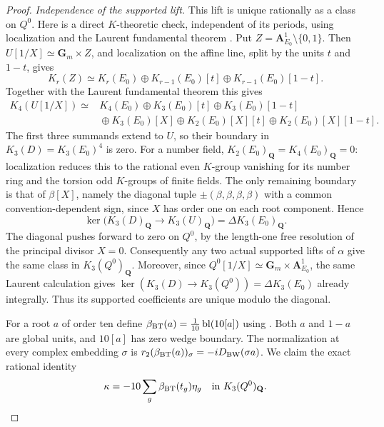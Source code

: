\documentclass[11pt,a4paper]{article}
\theoremstyle{remark}
\begin{document}
\begin{proof}
\emph{Independence of the supported lift.}
This lift is unique rationally as a class on $Q^0$.
Here is a direct $K$-theoretic check, independent of its periods,
using localization and the Laurent fundamental theorem \cite{Weibel}.
Put $Z=\mathbf A^1_{E_0}\setminus\{0,1\}$.  Then
$U[1/X]\simeq\mathbf G_m\times Z$, and localization on the
affine line, split by the units $t$ and $1-t$, gives
\[
 K_r(Z)\simeq K_r(E_0)\oplus
       K_{r-1}(E_0)[t]\oplus K_{r-1}(E_0)[1-t].
\]
Together with the Laurent fundamental theorem this gives
\[
\begin{split}
 K_4(U[1/X])\simeq{}&
 K_4(E_0)\oplus K_3(E_0)[t]\oplus K_3(E_0)[1-t]\\
 &{}\oplus K_3(E_0)[X]
 \oplus K_2(E_0)[X][t]\oplus K_2(E_0)[X][1-t].
\end{split}
\]
The first three summands extend to $U$, so their boundary in
$K_3(D)=K_3(E_0)^4$ is zero.  For a number field,
$K_2(E_0)_{\mathbf Q}=K_4(E_0)_{\mathbf Q}=0$: localization
reduces this to the rational even $K$-group vanishing for its
number ring and the torsion odd $K$-groups of finite fields.
The only remaining boundary is that of
$\beta[X]$, namely the diagonal tuple
$\pm(\beta,\beta,\beta,\beta)$ with a common convention-dependent
sign, since $X$ has order one on each root component.  Hence
\[
 \ker\bigl(K_3(D)_{\mathbf Q}\longrightarrow K_3(U)_{\mathbf Q}\bigr)
       =\Delta K_3(E_0)_{\mathbf Q}.
\]
The diagonal pushes forward to zero on $Q^0$, by the
length-one free resolution of the principal divisor $X=0$.
Consequently any two actual supported lifts of $\alpha$ give
the same class in $K_3(Q^0)_{\mathbf Q}$.
Moreover, since
$Q^0[1/X]\simeq\mathbf G_m\times\mathbf A^1_{E_0}$, the same
Laurent calculation gives
$\ker(K_3(D)\to K_3(Q^0))=\Delta K_3(E_0)$ already integrally.
Thus its supported coefficients are unique modulo the diagonal.

For a root $a$ of order ten define
$\beta_{\rm BT}(a)=\frac1{10}\operatorname{bl}(10[a])$
using \cite[Theorem~4.9 and (4.8)]{BunkeTamme}. Both $a$ and
$1-a$ are global units, and $10[a]$ has zero wedge boundary.
The normalization at every complex embedding $\sigma$ is
$r_2(\beta_{\rm BT}(a))_\sigma=-iD_{\rm BW}(\sigma a)$.
We claim the exact rational identity
\begin{equation}\label{eq:dimtwoUniversalCoefficients}
 \kappa=-10\sum_g\beta_{\rm BT}(t_g)\eta_g
          \quad\hbox{in }K_3(Q^0)_{\mathbf Q}.
\end{equation}


\end{proof}
\end{document}
